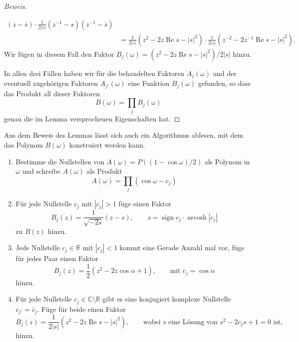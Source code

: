 \begin{proof}[Beweis]
\begin{enumerate}
\begin{align*}
(z-\bar{s})
\cdot
\frac1{2|s|}
(z^{-1}-s)
(z^{-1}-\bar{s})
\\
&=
\frac1{2|s|}(z^2-2z\operatorname{Re}s -|s|^2)
\cdot
\frac1{2|s|}(z^{-2}-2z^{-1}\operatorname{Re}s -|s|^2).
\end{align*}
Wir fügen in diesem Fall den Faktor $B_j(\omega)=(z^2-2z\operatorname{Re}s-|s|^2)/2|s|$ hinzu.
\end{enumerate}
In allen drei Fällen haben wir für die behandelten Faktoren $A_j(\omega)$
und der eventuell zugehörigen Faktoren $A_{j'}(\omega)$ eine Funktion
$B_j(\omega)$ gefunden, so dass das Produkt all dieser Faktoren
\[
B(\omega) = \prod_j B_j(\omega)
\]
genau die im Lemma versprochenen Eigenschaften hat.
\end{proof}

Aus dem Beweis des Lemmas lässt sich auch ein Algorithmus ablesen, mit
dem das Polynom $B(\omega)$ konstruiert werden kann.
\begin{enumerate}
\item
Bestimme die Nullstellen von $A(\omega) = P((1-\cos \omega)/2)$ 
als Polynom in $\omega$ und schreibe $A(\omega)$ als Produkt
\[
A(\omega) = \prod_j (\cos\omega - c_j)
\]
\item Für jede Nullstelle $c_j$ mit $|c_j|>1$ füge einen Faktor 
\[
B_j(z)=\frac{1}{\sqrt{-2s}}(z-s),\qquad s = \operatorname{sign}c_j\cdot \operatorname{arcosh}|c_j|
\]
zu $B(z)$ hinzu.
\item
Jede Nullstelle $c_j \in\mathbb R$ mit $|c_j|<1$ kommt eine Gerade Anzahl mal
vor, füge für jedes Paar einen Faktor
\[
B_j(z) = \frac12(z^2 -2 z\cos \alpha +1),
\qquad\text{mit $c_j=\cos\alpha$}
\]
hinzu.
\item
Für jede Nullstelle $c_j\in \mathbb C\setminus\mathbb R$ gibt es
eine konjugiert komplexe Nullstelle $c_{j'}=\bar{c}_j$.
Füge für beide einen Faktor
\[
B_j(z) = \frac{1}{2|s|}(z^2 -2z\operatorname{Re}s-|s|^2),
\qquad
\text{wobei $s$ eine Lösung von $s^2 -2c_js+1=0$ ist,}
\]
hinzu.
\end{enumerate}

